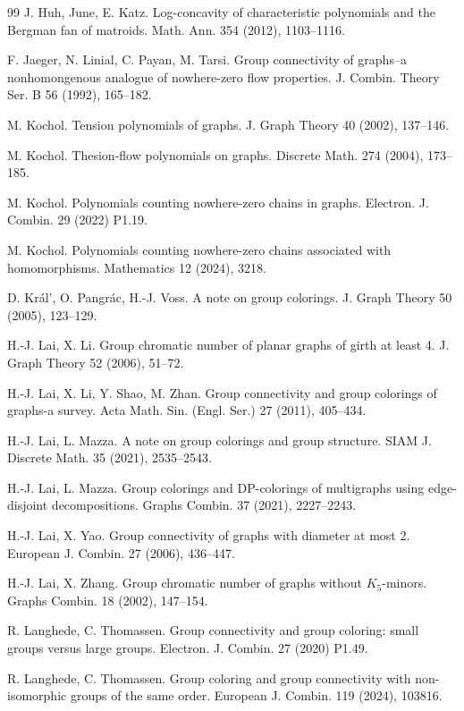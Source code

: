 \documentclass[12pt]{article}%
\numberwithin{equation}{section}
\begin{document}
\begin{thebibliography}{99}
J. Huh, June, E. Katz. Log-concavity of characteristic polynomials and the Bergman fan of matroids. Math. Ann. 354 (2012), 1103--1116.

F. Jaeger, N. Linial, C. Payan, M. Tarsi. Group connectivity of graphs--a nonhomongenous analogue of nowhere-zero flow properties.  J. Combin. Theory Ser. B 56 (1992), 165--182.

M. Kochol. Tension polynomials of graphs. J. Graph Theory 40 (2002), 137--146.

M. Kochol. Thesion-flow polynomials on graphs. Discrete Math. 274 (2004), 173--185.

M. Kochol. Polynomials counting nowhere-zero chains in graphs. Electron. J. Combin. 29 (2022) P1.19.

M. Kochol. Polynomials counting nowhere-zero chains associated with homomorphisms. Mathematics 12 (2024), 3218.

D. Kr\'al', O. Pangr\'ac, H.-J. Voss. A note on group colorings. J. Graph Theory 50 (2005), 123--129.

H.-J. Lai, X. Li. Group chromatic number of planar graphs of girth at least 4. J. Graph Theory 52 (2006), 51--72.

H.-J. Lai, X. Li, Y. Shao, M. Zhan. Group connectivity and group colorings of graphs-a survey. Acta Math. Sin. (Engl. Ser.) 27 (2011), 405--434.

H.-J. Lai, L. Mazza. A note on group colorings and group structure. SIAM J. Discrete Math. 35 (2021), 2535--2543.

H.-J. Lai, L. Mazza. Group colorings and DP-colorings of multigraphs using edge-disjoint decompositions. Graphs Combin. 37 (2021), 2227--2243.

H.-J. Lai, X. Yao. Group connectivity of graphs with diameter at most 2. European J. Combin. 27 (2006), 436--447.

H.-J. Lai, X. Zhang. Group chromatic number of graphs without  $K_5$-minors. Graphs Combin. 18 (2002), 147--154.

R. Langhede, C. Thomassen. Group connectivity and group coloring: small groups versus large groups. Electron. J. Combin. 27 (2020) P1.49.

R. Langhede, C. Thomassen. Group coloring and group connectivity with non-isomorphic groups of the same order. European J. Combin. 119 (2024), 103816.


\end{thebibliography}
\end{document}
